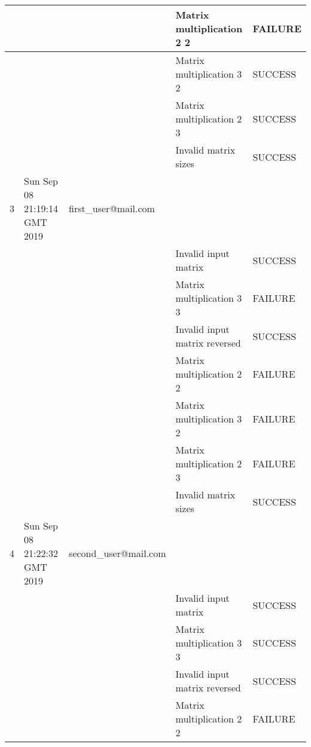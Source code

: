 \begin{center}
\begin{longtable}{|l|l|l|l|l|}
    &                              &                                 & Matrix multiplication 2 2     & FAILURE \\ \hline
    &                              &                                 & Matrix multiplication 3 2     & SUCCESS \\ \hline
    &                              &                                 & Matrix multiplication 2 3     & SUCCESS \\ \hline
    &                              &                                 & Invalid matrix sizes          & SUCCESS \\ \hline
    3     & Sun Sep 08 21:19:14 GMT 2019 & first\_user@mail.com &                               &         \\ \hline
    &                              &                                 & Invalid input matrix          & SUCCESS \\ \hline
    &                              &                                 & Matrix multiplication 3 3     & FAILURE \\ \hline
    &                              &                                 & Invalid input matrix reversed & SUCCESS \\ \hline
    &                              &                                 & Matrix multiplication 2 2     & FAILURE \\ \hline
    &                              &                                 & Matrix multiplication 3 2     & FAILURE \\ \hline
    &                              &                                 & Matrix multiplication 2 3     & FAILURE \\ \hline
    &                              &                                 & Invalid matrix sizes          & SUCCESS \\ \hline
    4     & Sun Sep 08 21:22:32 GMT 2019 & second\_user@mail.com               &                               &         \\ \hline
    &                              &                                 & Invalid input matrix          & SUCCESS \\ \hline
    &                              &                                 & Matrix multiplication 3 3     & SUCCESS \\ \hline
    &                              &                                 & Invalid input matrix reversed & SUCCESS \\ \hline
    &                              &                                 & Matrix multiplication 2 2     & FAILURE \\ \hline

\end{longtable}
\end{center}
